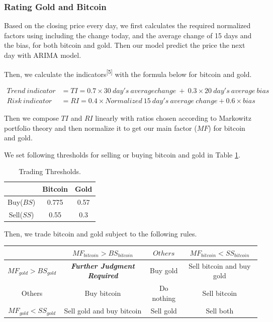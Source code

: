 \documentclass[12pt,a4paper]{article}
\begin{document}
\begin{spacing}{1.2}
\subsubsection{Rating Gold and Bitcoin}

Based on the closing price every day, we first calculates the required normalized factors using including the change today, and the average change of 15 days and the bias, for both bitcoin and gold. Then our model predict the price the next day with ARIMA model.

Then, we calculate the indicators\textsuperscript{[5]} with the formula below for bitcoin and gold. 


\begin{align*}
	Trend \ indicator &= TI = 0.7 \times 30 \ day's \ average change \ + \ 0.3 \times 20 \ day's \ average \ bias \\
	Risk \ indicator &= RI = 0.4 \times Normalized \ 15 \ day's \ average \ change + 0.6 \times bias
\end{align*}

Then we compose $TI$ and $RI$ linearly with ratios chosen according to Markowitz portfolio theory and then normalize it to get our main factor ($MF$) for bitcoin and gold. 

We set following thresholds for selling or buying bitcoin and gold in Table \ref{table:threshold}.

\begin{table}[H]
	\renewcommand{\arraystretch}{1.5}
	\caption{Trading Thresholds.}
	\label{table:threshold}
	\begin{center}
		{\footnotesize
			\begin{tabular}{c c c}
				\toprule
				{ } & {Bitcoin} & {Gold} \\
				\midrule
				Buy($BS$) & 0.775 & 0.57 \\
				Sell($SS$) & 0.55 & 0.3 \\
				\bottomrule
		\end{tabular}}
	\end{center}	
\end{table}

Then, we trade bitcoin and gold subject to the following rules.

\begin{center}
	\begin{tabular}{ |c|c|c|c| } 
		\hline
		& $MF_{bitcoin} > BS_{bitcoin}$ & $Others$ & $MF_{bitcoin} < SS_{bitcoin}$ \\ 
		\hline
		$MF_{gold} > BS_{gold}$ & \textbf{\textit{Further Judgment Required}}  & Buy gold & Sell bitcoin and buy gold  \\ 
		\hline
		Others & Buy bitcoin & Do nothing & Sell bitcoin \\
		\hline
		$MF_{gold} < SS_{gold}$ & Sell gold and buy bitcoin & Sell gold & Sell both \\ 
		\hline
	\end{tabular}
\end{center}


\end{spacing}
\end{document}
